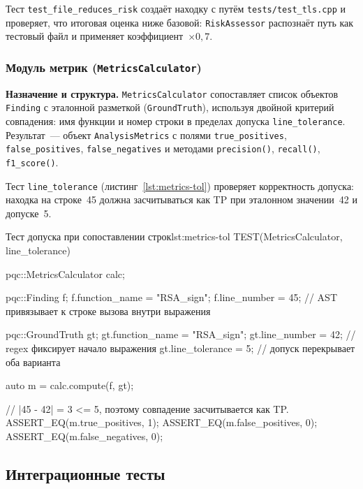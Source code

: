 Тест \texttt{test\_file\_reduces\_risk} создаёт находку с путём
\texttt{tests/\allowbreak test\_tls.cpp} и проверяет, что итоговая
оценка ниже базовой: \texttt{RiskAssessor} распознаёт путь как
тестовый файл и применяет коэффициент~$\times0{,}7$.

\subsubsection{Модуль метрик (\texttt{MetricsCalculator})}

\textbf{Назначение и структура.}
\texttt{MetricsCalculator} сопоставляет список объектов
\texttt{Finding} с эталонной разметкой (\texttt{GroundTruth}),
используя двойной критерий совпадения: имя функции и номер строки
в пределах допуска \texttt{line\_tolerance}.
Результат~--- объект \texttt{AnalysisMetrics} с полями
\texttt{true\_positives}, \texttt{false\_positives},
\texttt{false\_negatives} и методами \texttt{precision()},
\texttt{recall()}, \texttt{f1\_score()}.

Тест \texttt{line\_tolerance} (листинг~\ref{lst:metrics-tol})
проверяет корректность допуска: находка на строке~45 должна
засчитываться как TP при эталонном значении~42 и допуске~5.

\begin{itmolisting}[C++]{Тест допуска при сопоставлении строк}{lst:metrics-tol}
TEST(MetricsCalculator, line_tolerance) {
    pqc::MetricsCalculator calc;

    pqc::Finding f;
    f.function_name = "RSA_sign";
    f.line_number   = 45; // AST привязывает к строке вызова внутри выражения

    pqc::GroundTruth gt;
    gt.function_name  = "RSA_sign";
    gt.line_number    = 42; // regex фиксирует начало выражения
    gt.line_tolerance = 5;  // допуск перекрывает оба варианта

    auto m = calc.compute({f}, {gt});

    // |45 - 42| = 3 <= 5, поэтому совпадение засчитывается как TP.
    ASSERT_EQ(m.true_positives,  1);
    ASSERT_EQ(m.false_positives, 0);
    ASSERT_EQ(m.false_negatives, 0);
}
\end{itmolisting}

\subsection{Интеграционные тесты}

